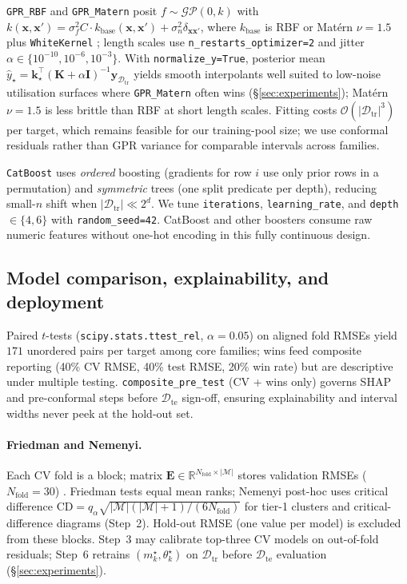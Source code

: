 \documentclass[12pt,twocolumn,a4paper]{article}
\theoremstyle{plain}
\theoremstyle{definition}
\theoremstyle{remark}
\newcommand{\train}{\mathcal{D}_{\mathrm{tr}}}
\newcommand{\test}{\mathcal{D}_{\mathrm{te}}}
\newcommand{\R}{\mathbb{R}}
\begin{document}
\texttt{GPR\_RBF} and \texttt{GPR\_Matern} posit $f \sim \mathcal{GP}(0,k)$ with
$k(\mathbf{x},\mathbf{x}') = \sigma_f^2 C \cdot k_{\mathrm{base}}(\mathbf{x},\mathbf{x}') + \sigma_n^2 \delta_{\mathbf{x}\mathbf{x}'}$,
where $k_{\mathrm{base}}$ is RBF or Mat\'ern $\nu{=}1.5$ plus \texttt{WhiteKernel} \citep{santner2003design,forrester2008}; length scales use \texttt{n\_restarts\_optimizer=2} and jitter $\alpha \in \{10^{-10},10^{-6},10^{-3}\}$.
With \texttt{normalize\_y=True}, posterior mean
$\hat{y}_\star = \mathbf{k}_\star^\top (\mathbf{K}+\alpha\mathbf{I})^{-1}\mathbf{y}_{\train}$
yields smooth interpolants well suited to low-noise utilisation surfaces where \texttt{GPR\_Matern} often wins (\S\ref{sec:experiments}); Mat\'ern $\nu{=}1.5$ is less brittle than RBF at short length scales.
Fitting costs $\mathcal{O}(|\train|^3)$ per target, which remains feasible for our training-pool size; we use conformal residuals rather than GPR variance for comparable intervals across families.

\texttt{CatBoost} \citep{bentejac2019} uses \emph{ordered} boosting (gradients for row $i$ use only prior rows in a permutation) and \emph{symmetric} trees (one split predicate per depth), reducing small-$n$ shift when $|\train| \ll 2^d$.
We tune \texttt{iterations}, \texttt{learning\_rate}, and \texttt{depth} $\in \{4,6\}$ with \texttt{random\_seed=42}.
CatBoost and other boosters consume raw numeric features without one-hot encoding in this fully continuous design.

\subsection{Model comparison, explainability, and deployment}
\label{sec:method-compare}

Paired $t$-tests (\texttt{scipy.stats.ttest\_rel}, $\alpha{=}0.05$) on aligned fold RMSEs yield $171$ unordered pairs per target among core families; wins feed composite reporting (40\% CV RMSE, 40\% test RMSE, 20\% win rate) but are descriptive under multiple testing.
\texttt{composite\_pre\_test} (CV + wins only) governs SHAP and pre-conformal steps before $\test$ sign-off, ensuring explainability and interval widths never peek at the hold-out set.

\paragraph{Friedman and Nemenyi.}
Each CV fold is a block; matrix $\mathbf{E} \in \R^{N_{\mathrm{fold}} \times |\mathcal{M}|}$ stores validation RMSEs ($N_{\mathrm{fold}}{=}30$) \citep{demvsar2006statistical,nemenyi1963distribution,jia2025pairwise}.
Friedman tests equal mean ranks; Nemenyi post-hoc uses critical difference
$\mathrm{CD} = q_\alpha \sqrt{|\mathcal{M}|(|\mathcal{M}|+1)/(6N_{\mathrm{fold}})}$ for tier-1 clusters and critical-difference diagrams (Step~2).
Hold-out RMSE (one value per model) is excluded from these blocks.
Step~3 may calibrate top-three CV models on out-of-fold residuals; Step~6 retrains $(m^\star_k,\theta^\star_k)$ on $\train$ before $\test$ evaluation (\S\ref{sec:experiments}).
\end{document}
